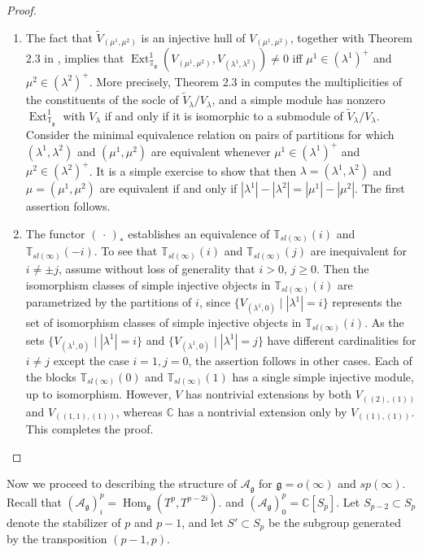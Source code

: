 \documentclass{amsart}
\renewcommand{\sl}{sl}
\newcommand{\so}{o}
\newcommand{\T}{\mathbb T}
\newcommand{\Tg}{\mathbb T_{\mathfrak g}}
\renewcommand{\sp}{sp}
\renewcommand{\gg}{\mathfrak{g}}
\newcommand{\CC}{\mathbb{C}}
\theoremstyle{definition}
\numberwithin{equation}{section}
\begin{document}
\begin{proof}
\begin{enumerate}
\item The fact that $\tilde{V}_{(\mu^1,\mu^2)}$ is an injective hull of $V_{(\mu^1,\mu^2)}$, together with Theorem 2.3 in \cite{PStyr}, implies that
  $\operatorname{Ext}_{\Tg}^1(V_{(\mu^1,\mu^2)},V_{(\lambda^1,\lambda^2)})\neq 0$
  iff $\mu^1\in(\lambda^1)^+$ and
  $\mu^2\in(\lambda^2)^+$.  More precisely, Theorem 2.3 in \cite{PStyr} computes the multiplicities of the constituents of the socle of $\tilde V_\lambda / V_\lambda$, and a simple module has nonzero $\operatorname{Ext}_{\Tg}^1$ with $V_\lambda$ if and only if it is isomorphic to a submodule of $\tilde V_\lambda / V_\lambda$.  Consider the minimal equivalence relation
  on pairs of partitions for which $(\lambda^1,\lambda^2)$ and $(\mu^1,\mu^2)$ are equivalent whenever $\mu^1\in(\lambda^1)^+$ and $\mu^2\in(\lambda^2)^+$.
  It is a simple exercise to show that then $\lambda=(\lambda^1,\lambda^2)$
  and $\mu=(\mu^1,\mu^2)$ are equivalent if and only if  $|\lambda^1| -  |\lambda^2| = |\mu^1| - | \mu^2|.$ 
The first assertion follows.
\item The functor $( \, \cdot \, )_*$ establishes an equivalence of
  $\T_{\sl(\infty)} (i)$ and $\T_{\sl(\infty)} (-i)$.  To see that
  $\T_{\sl(\infty)} (i)$ and $\T_{\sl(\infty)} (j)$ are inequivalent
  for $i \neq \pm j$, assume without loss of generality that $i>0$, $j
  \geq 0$.  Then the isomorphism classes of simple injective
objects in $\T_{\sl(\infty)} (i)$ are parametrized by the partitions
of $i$, since $\{ V_{(\lambda^1 , 0)} \mid  |\lambda^1| = i \}$
represents the set of isomorphism classes of simple injective objects
in $\T_{\sl(\infty)} (i)$.  As the sets 
$\{ V_{(\lambda^1 , 0)} \mid |\lambda^1| = i \}$ and $\{ V_{(\lambda^1  , 0)} \mid  |\lambda^1| = j\}$ have different cardinalities for $i\neq j$ 
except the case $i=1,j=0$, the assertion follows in other cases. Each of the blocks $\T_{\sl(\infty)} (0)$ and $\T_{\sl(\infty)} (1)$ has a single simple injective module, up to isomorphism. However, $V$ has nontrivial extensions by both $V_{((2),(1))}$ and $V_{((1,1),(1))}$, whereas $\CC$ has a nontrivial extension only by $V_{((1),(1))}$.  This completes the proof.
\end{enumerate}
\end{proof}


Now we proceed to describing the structure of $\mathcal A_\gg$ for
$\gg=\so(\infty)$ and $\sp(\infty)$.  Recall that
$(\mathcal A_\gg)_i^p=\operatorname{Hom}_\gg(T^p,T^{p-2i}).$ and $(\mathcal A_\gg)_0^p=\mathbb C[S_p]$.
Let $S_{p-2}\subset S_p$ denote the stabilizer of
$p$ and $p-1$, and let $S' \subset S_p$ be the subgroup generated by the transposition $(p-1,p)$.
\end{document}
